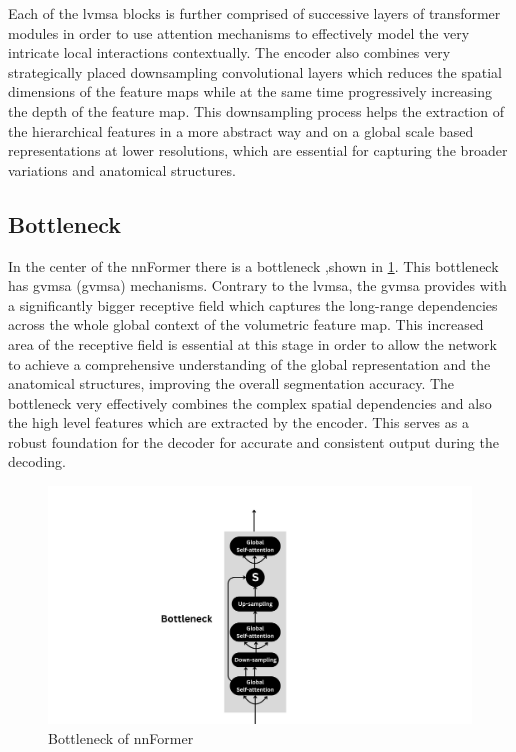 Each of the \gls{lvmsa} blocks is further comprised of successive layers of transformer modules in order to use attention mechanisms to effectively model the very intricate local interactions contextually. The encoder also combines very strategically placed downsampling convolutional layers which reduces the spatial dimensions of the feature maps while at the same time progressively increasing the depth of the feature map. This downsampling process helps the extraction of the hierarchical features in a more abstract way and on a global scale based representations at lower resolutions, which are essential for capturing the broader variations and anatomical structures.

\subsection{Bottleneck}
In the center of the nnFormer there is a bottleneck ,shown in \cref{Fig:bottleneck}. This bottleneck has \gls{gvmsa} (\gls{gvmsa}) mechanisms. Contrary to the \gls{lvmsa}, the \gls{gvmsa} provides with a significantly bigger receptive field which captures the long-range dependencies across the whole global context of the volumetric feature map. This increased area of the receptive field is essential at this stage in order to allow the network to achieve a comprehensive understanding of the global representation and the anatomical structures, improving the overall segmentation accuracy. The bottleneck very effectively combines the complex spatial dependencies and also the high level features which are extracted by the encoder. This serves as a robust foundation for the decoder for accurate and consistent output during the decoding.

\begin{figure}[htb!] %
\centering
\centering
\includegraphics[width=1\textwidth]{images/Bottleneck.png}
\caption{\centering Bottleneck of nnFormer}
\label{Fig:bottleneck}
\end{figure}

